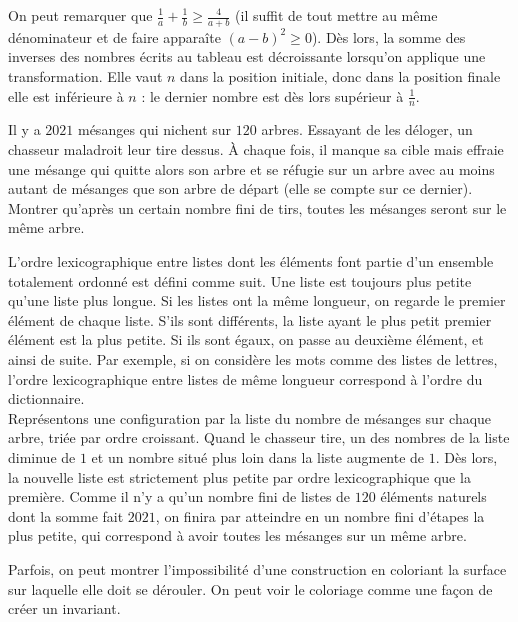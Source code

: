 \begin{sol}
On peut remarquer que $\frac1{a}+\frac1{b}\geq \frac{4}{a+b}$ (il suffit de tout mettre au même dénominateur et de faire apparaîte $(a-b)^2\geq0$). Dès lors, la somme des inverses des nombres écrits au tableau est décroissante lorsqu'on applique une transformation. Elle vaut $n$ dans la position initiale, donc dans la position finale elle est inférieure à $n$ : le dernier nombre est dès lors supérieur à $\frac1{n}$.
\end{sol}

\begin{exo}
Il y a $2021$ mésanges qui nichent sur $120$ arbres. Essayant de les déloger, un chasseur maladroit leur tire dessus. À chaque fois, il manque sa cible mais effraie une mésange qui quitte alors son arbre et se réfugie sur un arbre avec au moins autant de mésanges que son arbre de départ (elle se compte sur ce dernier). Montrer qu'après un certain nombre fini de tirs, toutes les mésanges seront sur le même arbre.
\end{exo}

\begin{sol}
L'ordre lexicographique entre listes dont les éléments font partie d'un ensemble totalement ordonné est défini comme suit. Une liste est toujours plus petite qu'une liste plus longue. Si les listes ont la même longueur, on regarde le premier élément de chaque liste. S'ils sont différents, la liste ayant le plus petit premier élément est la plus petite. Si ils sont égaux, on passe au deuxième élément, et ainsi de suite. Par exemple, si on considère les mots comme des listes de lettres, l'ordre lexicographique entre listes de même longueur correspond à l'ordre du dictionnaire.\\
Représentons une configuration par la liste du nombre de mésanges sur chaque arbre, triée par ordre croissant. Quand le chasseur tire, un des nombres de la liste diminue de $1$ et un nombre situé plus loin dans la liste augmente de $1$. Dès lors, la nouvelle liste est strictement plus petite par ordre lexicographique que la première. Comme il n'y a qu'un nombre fini de listes de $120$ éléments naturels dont la somme fait $2021$, on finira par atteindre en un nombre fini d'étapes la plus petite, qui correspond à avoir toutes les mésanges sur un même arbre.
\end{sol}


Parfois, on peut montrer l'impossibilité d'une construction en coloriant la surface sur laquelle elle doit se dérouler. On peut voir le coloriage comme une façon de créer un invariant.\\

